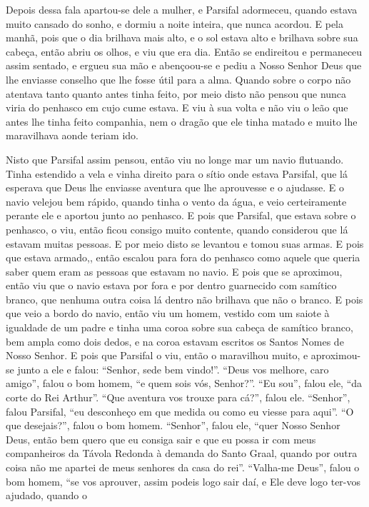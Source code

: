 Depois dessa fala apartou-se dele a mulher, e Parsifal adormeceu, quando
estava muito cansado do sonho, e dormiu a noite inteira, que nunca acordou. E
pela manhã, pois que o dia brilhava mais alto, e o sol estava alto e brilhava
sobre sua cabeça, então abriu os olhos, e viu que era dia. Então se endireitou
e permaneceu assim sentado, e ergueu sua mão e abençoou-se e pediu a Nosso
Senhor Deus que lhe enviasse conselho que lhe fosse útil para a alma. Quando
sobre o corpo não atentava tanto quanto antes tinha feito, por meio disto não
pensou que nunca viria do penhasco em cujo cume estava. E viu à sua volta e não
viu o leão que antes lhe tinha feito companhia, nem o dragão que ele tinha
matado e muito lhe maravilhava aonde teriam ido. 

Nisto que Parsifal assim pensou, então viu no longe mar um navio flutuando.
Tinha estendido a vela e vinha direito para o sítio onde estava Parsifal, que
lá esperava que Deus lhe enviasse aventura que lhe aprouvesse e o ajudasse. E o
navio velejou bem rápido, quando tinha o vento da água, e veio certeiramente
perante ele e aportou junto ao penhasco. E pois que Parsifal, que estava sobre
o penhasco, o viu, então ficou consigo muito contente, quando considerou que lá
estavam muitas pessoas. E por meio disto se levantou e tomou suas armas. E pois
que estava armado,,  então escalou para fora do penhasco como aquele que queria
saber quem eram as pessoas que estavam no navio. E pois que se aproximou, então
viu que o navio estava por fora e por dentro guarnecido com samítico branco,
que nenhuma outra coisa lá dentro não brilhava que não o branco. E pois que
veio a bordo do navio, então viu um homem, vestido com um saiote à igualdade de
um padre e tinha uma coroa sobre sua cabeça de samítico branco, bem ampla como
dois dedos, e na coroa estavam escritos os Santos Nomes de Nosso Senhor. E pois
que Parsifal o viu, então o maravilhou muito, e aproximou-se junto a ele e
falou: “Senhor, sede bem vindo!”. “Deus vos melhore, caro amigo”, falou o bom
homem, “e quem sois vós, Senhor?”. “Eu sou”, falou ele, “da corte do Rei
Arthur”. “Que aventura vos trouxe para cá?”, falou ele. “Senhor”, falou
Parsifal, “eu desconheço em que medida ou como eu viesse para aqui”. “O que
desejais?”, falou o bom homem. “Senhor”, falou ele, “quer Nosso Senhor Deus,
então bem quero que eu consiga sair e que eu possa ir com meus companheiros da
Távola Redonda à demanda do Santo Graal, quando por outra coisa não me apartei
de meus senhores da casa do rei”. “Valha-me Deus”, falou o bom homem, “se vos
aprouver, assim podeis logo sair daí, e Ele deve logo ter-vos ajudado, quando o
